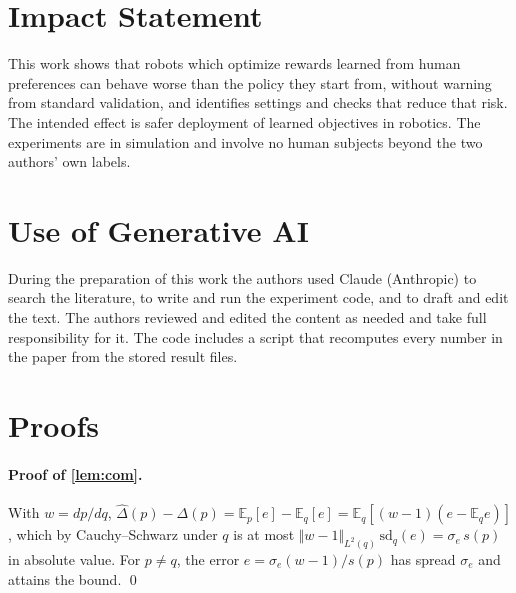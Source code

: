 \documentclass{article}
\theoremstyle{plain}
\theoremstyle{remark}
\newcommand{\E}{\mathbb{E}}
\begin{document}
\section*{Impact Statement}
This work shows that robots which optimize rewards learned from human preferences can behave worse than the policy
they start from, without warning from standard validation, and identifies settings and checks that reduce that risk.
The intended effect is safer deployment of learned objectives in robotics. The experiments are in simulation and
involve no human subjects beyond the two authors' own labels.

\section*{Use of Generative AI}
During the preparation of this work the authors used Claude (Anthropic) to search the literature, to write and run
the experiment code, and to draft and edit the text. The authors reviewed and edited the content as needed and take
full responsibility for it. The code includes a script that recomputes every number in the paper from the stored
result files.




\newpage
\appendix
\onecolumn

\section{Proofs}
\label{app:proofs}

\paragraph{Proof of \cref{lem:com}.} With $w=dp/dq$, $\hat\Delta(p)-\Delta(p)=\E_p[e]-\E_q[e]=\E_q[(w-1)(e-\E_qe)]$, which by
Cauchy--Schwarz under $q$ is at most $\Vert w-1\Vert_{L^2(q)}\,\mathrm{sd}_q(e)=\sigma_e\,s(p)$ in absolute value. For
$p\ne q$, the error $e=\sigma_e(w-1)/s(p)$ has spread $\sigma_e$ and attains the bound. \qed
\end{document}
